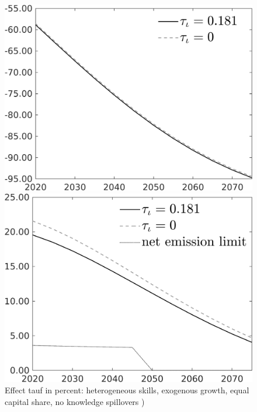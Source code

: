 \documentclass[12pt]{article}
\begin{document}
\begin{figure}[h!!]
	\centering
	\caption{Effect tauf in percent: heterogeneous skills, exogenous growth, equal capital share, no knowledge spillovers )}\label{fig:Leveltauf_nsk0_xgr1_equalcapShare_noknow_notaul}
	\begin{minipage}[]{0.32\textwidth}
		\includegraphics[width=1\textwidth]{../../codding_model/own_basedOnFried/optimalPol_010922_revision/figures/all_13Sept22/PerdifNoTauf_Equlab_regime0_CompTaul_Emnet_spillover0_nsk0_xgr1_knspil1_sep1_LFlimit0_emsbase0_countec0_GovRev0_etaa0.79_lgd1.png}
	\end{minipage}	
	\begin{minipage}[]{0.32\textwidth}
		\includegraphics[width=1\textwidth]{../../codding_model/own_basedOnFried/optimalPol_010922_revision/figures/all_13Sept22/CompTauf_bytaul_Equlab_Reg0_Emnet_spillover0_nsk0_xgr1_knspil1_sep1_LFlimit0_emsbase0_countec0_GovRev0_etaa0.79_lgd1.png}

\end{minipage}
\end{figure}
\end{document}
